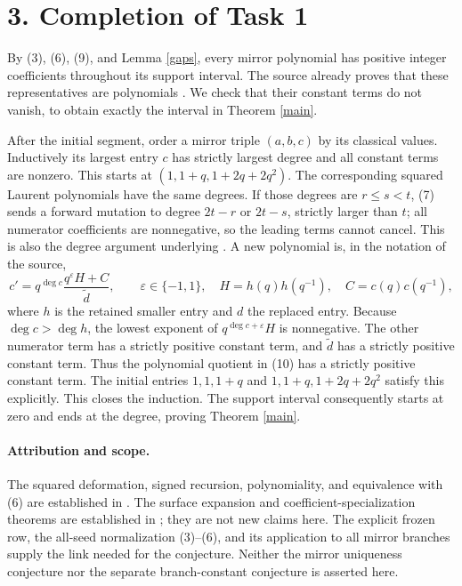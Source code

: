 \documentclass[11pt]{article}
\begin{document}
\section*{3. Completion of Task 1}
By (3), (6), (9), and Lemma \ref{gaps}, every mirror polynomial has positive
integer coefficients throughout its support interval. The source already
proves that these representatives are polynomials
\cite[Theorem 4.4]{mirror}. We check that their constant terms do not vanish,
to obtain exactly the interval in Theorem \ref{main}.

After the initial segment, order a mirror triple $(a,b,c)$ by its classical
values. Inductively its largest entry $c$ has strictly largest degree and all
constant terms are nonzero. This starts at $(1,1+q,1+2q+2q^2)$.
The corresponding squared Laurent polynomials have the same degrees.
If those degrees are $r\le s<t$, (7) sends a forward mutation to degree
$2t-r$ or $2t-s$, strictly larger than $t$; all numerator coefficients are
nonnegative, so the leading terms cannot cancel. This is also the degree
argument underlying \cite[Proposition 2.3]{mirror}. A new polynomial is,
in the notation of the source,
\[
 c'=q^{\deg c}\frac{q^\varepsilon H+C}{\widetilde d},
 \qquad \varepsilon\in\{-1,1\},\quad
 H=h(q)h(q^{-1}),\quad C=c(q)c(q^{-1}), \tag{10}
\]
where $h$ is the retained smaller entry and $d$ the replaced entry.
Because $\deg c>\deg h$, the lowest exponent of
$q^{\deg c+\varepsilon}H$ is nonnegative. The other numerator term has a
strictly positive constant term, and $\widetilde d$ has a strictly positive
constant term. Thus the polynomial quotient in (10) has a strictly positive
constant term. The initial entries $1,1,1+q$ and $1,1+q,1+2q+2q^2$ satisfy
this explicitly. This closes the induction. The support interval consequently
starts at zero and ends at the degree, proving Theorem \ref{main}.

\paragraph{Attribution and scope.}
The squared deformation, signed recursion, polynomiality, and equivalence
with (6) are established in \cite{mirror}. The surface expansion and
coefficient-specialization theorems are established in \cite{msw}; they are
not new claims here. The explicit frozen row, the all-seed normalization
(3)--(6), and its application to all mirror branches supply the link needed
for the conjecture. Neither the mirror uniqueness conjecture nor the
separate branch-constant conjecture is asserted here.
\end{document}
